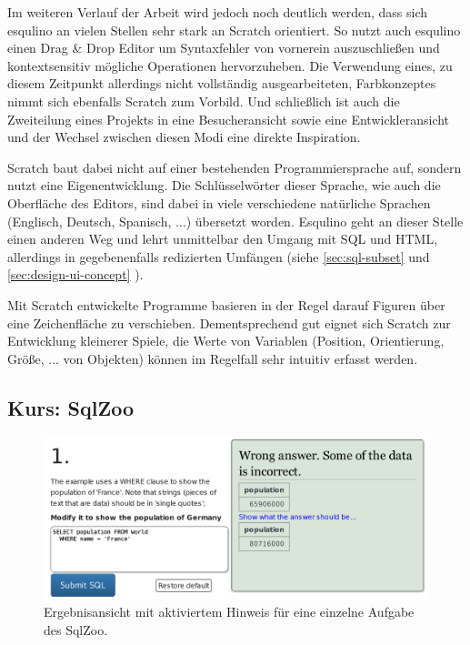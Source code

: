 Im weiteren Verlauf der Arbeit wird jedoch noch deutlich werden, dass sich esqulino an vielen Stellen sehr stark an Scratch orientiert. So nutzt auch esqulino einen Drag \& Drop Editor um Syntaxfehler von vornerein auszuschließen und kontextsensitiv mögliche Operationen hervorzuheben. Die Verwendung eines, zu diesem Zeitpunkt allerdings nicht vollständig ausgearbeiteten, Farbkonzeptes nimmt sich ebenfalls Scratch zum Vorbild. Und schließlich ist auch die Zweiteilung eines Projekts in eine Besucheransicht sowie eine Entwickleransicht und der Wechsel zwischen diesen Modi eine direkte Inspiration.

Scratch baut dabei nicht auf einer bestehenden Programmiersprache auf, sondern nutzt eine Eigenentwicklung. Die Schlüsselwörter dieser Sprache, wie auch die Oberfläche des Editors, sind dabei in viele verschiedene natürliche Sprachen (Englisch, Deutsch, Spanisch, ...) übersetzt worden. Esqulino geht an dieser Stelle einen anderen Weg und lehrt unmittelbar den Umgang mit SQL und HTML, allerdings in gegebenenfalls redizierten Umfängen (siehe \ref{sec:sql-subset}  und \ref{sec:design-ui-concept} ).

Mit Scratch entwickelte Programme basieren in der Regel darauf Figuren über eine Zeichenfläche zu verschieben. Dementsprechend gut eignet sich Scratch zur Entwicklung kleinerer Spiele, die Werte von Variablen (Position, Orientierung, Größe, ... von Objekten) können im Regelfall sehr intuitiv erfasst werden.

\subsection{Kurs: SqlZoo}

\begin{figure}[p]
  \centering \includegraphics[width=\textwidth]{images/related-work-sql-zoo.png}
  \caption{Ergebnisansicht mit aktiviertem Hinweis für eine einzelne Aufgabe des SqlZoo.}
  \label{fig:sqlzoo-check-result}
\end{figure}

